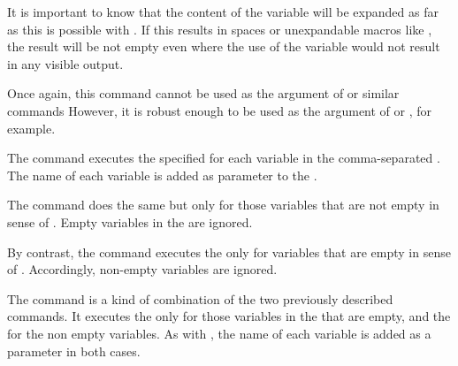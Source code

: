 \begin{Declaration}
\end{Declaration}
It is important to know that the content of the variable will be expanded as
far as this is possible with . If this results in spaces or
unexpandable macros like , the result will be not empty even
where the use of the variable would not result in any visible output.

Once again, this command cannot be used as the argument
of  or similar commands However,
it is robust enough to be used as the argument of
 or , for
example.%
%
\EndIndexGroup


\begin{Declaration}
\end{Declaration}
The
 command executes the specified  for each
variable in the comma-separated . The name of each
variable is added as parameter to the .%

The  command does the same but only for those
variables that are not empty in sense of
. Empty variables in the  are ignored.

By contrast, the  command executes the
 only for variables that are empty in sense of
. Accordingly, non-empty variables are
ignored.

The  command is a kind of combination of the two
previously described commands. It executes the  only for
those variables in the  that are empty, and the
 for the non empty variables. As with , the
name of each variable is added as a parameter in both cases.%
\EndIndexGroup
%
\EndIndexGroup


